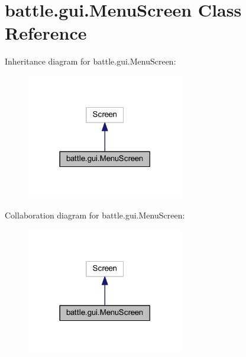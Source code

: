 \hypertarget{classbattle_1_1gui_1_1_menu_screen}{}\section{battle.\+gui.\+Menu\+Screen Class Reference}
\label{classbattle_1_1gui_1_1_menu_screen}


Inheritance diagram for battle.\+gui.\+Menu\+Screen\+:
\nopagebreak
\begin{figure}[H]
\begin{center}
\leavevmode
\includegraphics[width=194pt]{classbattle_1_1gui_1_1_menu_screen__inherit__graph}
\end{center}
\end{figure}


Collaboration diagram for battle.\+gui.\+Menu\+Screen\+:
\nopagebreak
\begin{figure}[H]
\begin{center}
\leavevmode
\includegraphics[width=194pt]{classbattle_1_1gui_1_1_menu_screen__coll__graph}
\end{center}
\end{figure}
